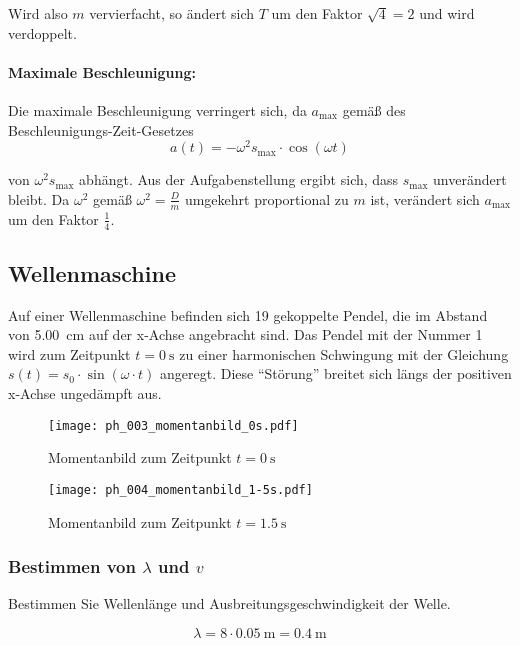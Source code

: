 \documentclass{ajc}
\begin{document}
	Wird also $m$ vervierfacht, so ändert sich $T$ um den Faktor $\sqrt{4} = 2$ und wird verdoppelt.
	
	\paragraph{Maximale Beschleunigung:} Die maximale Beschleunigung verringert sich, da $a_\text{max}$ gemäß des Beschleunigungs-Zeit-Gesetzes 
	\begin{equation}
		a(t) = -\omega^2 s_\text{max} \cdot \cos\left(\omega t\right)
	\end{equation}
	
	von $\omega^2 s_\text{max}$ abhängt. Aus der Aufgabenstellung ergibt sich, dass $s_\text{max}$ unverändert bleibt. Da $\omega^2$ gemäß $\omega^2 = \frac{D}{m}$ umgekehrt proportional zu $m$ ist, verändert sich $a_\text{max}$ um den Faktor $\frac{1}{4}$.
	
	\subsection{Wellenmaschine}
	Auf einer Wellenmaschine befinden sich 19 gekoppelte Pendel, die im Abstand von \SI{5,00}{\centi\meter} auf der x-Achse angebracht sind. Das Pendel mit der Nummer 1 wird zum Zeitpunkt $t = \SI{0}{\second}$ zu einer harmonischen Schwingung mit der Gleichung $s(t) = s_0 \cdot \sin(\omega \cdot t)$ angeregt. Diese \enquote{Störung} breitet sich längs der positiven x-Achse ungedämpft aus.
	
	\begin{figure}[ht]
		\centering
		\texttt{[image: ph\_003\_momentanbild\_0s.pdf]}
		\caption{Momentanbild zum Zeitpunkt $t = \SI{0}{\second}$}
		\label{fig:mom_0s}
	\end{figure}
	
	\begin{figure}[ht]
		\centering
		\texttt{[image: ph\_004\_momentanbild\_1-5s.pdf]}
		\caption{Momentanbild zum Zeitpunkt $t = \SI{1,5}{\second}$}
		\label{fig:mom_1.5s}
	\end{figure}
	
	\subsubsection{Bestimmen von $\lambda$ und $v$}
	Bestimmen Sie Wellenlänge und Ausbreitungsgeschwindigkeit der Welle.
	
	\begin{equation}
		\lambda = 8 \cdot \SI{0,05}{\m} = \SI{0,4}{\m}
	\end{equation}
	
\end{document}
